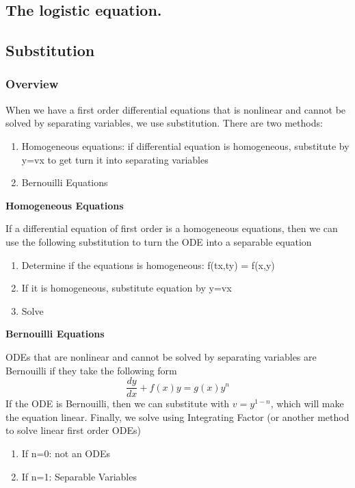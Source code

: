 \documentclass{article}
\begin{document}
\subsection{The logistic equation.}

\pagebreak

\subsection{Substitution}%
\label{sub:Substitution}

\subsubsection{Overview}%
\label{ssub:Overview}

When we have a first order differential equations that is nonlinear and
cannot be solved by separating variables, we use substitution. There
are two methods:
\begin{enumerate}
    \item Homogeneous equations: if differential equation is homogeneous,
	substitute by y=vx to get turn it into separating variables
    \item Bernouilli Equations
\end{enumerate}

\textbf{Homogeneous Equations}

If a differential equation of first order is a homogeneous equations,
then we can use the following substitution to turn the ODE into a
separable equation

\begin{enumerate}
    \item Determine if the equations is homogeneous: f(tx,ty) = f(x,y)
    \item If it is homogeneous, substitute equation by y=vx
    \item Solve
\end{enumerate}

\textbf{Bernouilli Equations}

ODEs that are nonlinear and cannot be solved by separating variables are
Bernouilli if they take the following form
$$ \frac{dy}{dx} + f(x)y = g(x) y^n$$
If the ODE is Bernouilli, then we can substitute with $ v = y^{1-n}$,
which will make the equation linear. Finally, we solve using Integrating
Factor (or another method to solve linear first order ODEs)

\begin{remark}
    \begin{enumerate}
        \item If n=0: not an ODEs
	\item If n=1: Separable Variables
    \end{enumerate}
\end{remark}
\end{document}
